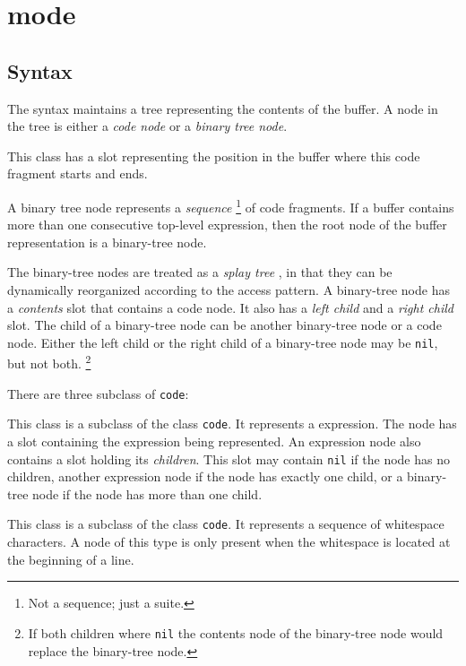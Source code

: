 \chapter{\commonlisp{} mode}
\label{chap-internals-common-lisp-mode}

\section{Syntax}

The \commonlisp{} syntax maintains a tree representing the contents of
the buffer.  A node in the tree is either a \emph{code node} or
a \emph{binary tree node}.


This class has a slot representing the position in the buffer where
this code fragment starts and ends.


A binary tree node represents a \emph{sequence}%
\footnote{Not a \commonlisp{} sequence; just a suite.}  of code
fragments.  If a buffer contains more than one consecutive top-level
expression, then the root node of the buffer representation is a
binary-tree node.

The binary-tree nodes are treated as a \emph{splay tree}
\cite{Sleator:1985:SBS:3828.3835}, in that they can be dynamically
reorganized according to the access pattern.  A binary-tree node has a
\emph{contents} slot that contains a code node.  It also has a
\emph{left child} and a \emph{right child} slot.  The child of a
binary-tree node can be another binary-tree node or a code node.
Either the left child or the right child of a binary-tree node may be
\texttt{nil}, but not both.%
\footnote{If both children where \texttt{nil} the contents node of the
  binary-tree node would replace the binary-tree node.}

There are three subclass of \texttt{code}:


This class is a subclass of the class \texttt{code}.  It represents a
\commonlisp{} expression.  The node has a slot containing the
expression being represented.  An expression node also
contains a slot holding its \emph{children}.  This slot may contain
\texttt{nil} if the node has no children, another expression node if
the node has exactly one child, or a binary-tree node if the node has
more than one child.


This class is a subclass of the class \texttt{code}.  It represents a
sequence of whitespace characters.  A node of this type is only
present when the whitespace is located at the beginning of a line.

